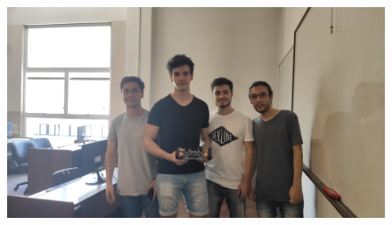 \begin{figure}[H]
	\centering
	\includegraphics[width=0.9\linewidth]{imagenes/final6.jpg}
	\label{fig:final6}
\end{figure}